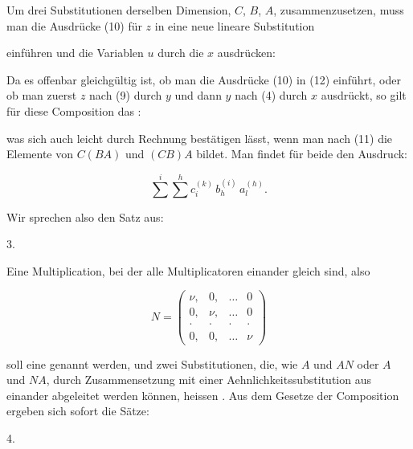 Um drei Substitutionen derselben Dimension, $C$, $B$, $A$, zusammenzusetzen, muss man die Ausdrücke (10) für $z$ in eine neue lineare Substitution


einführen und die Variablen $u$ durch die $x$ ausdrücken:


Da es offenbar gleichgültig ist, ob man die Ausdrücke (10) in (12) einführt, oder ob man zuerst $z$ nach (9) durch $y$ und dann $y$ nach (4) durch $x$ ausdrückt, so gilt für diese Composition das :


was sich auch leicht durch Rechnung bestätigen lässt, wenn man nach (11) die Elemente von $C(BA)$ und $(CB)A$ bildet. Man findet für beide den Ausdruck:

\[
\sum^i \sum^h c_i^{(k)}\, b_h^{(i)}\, a_l^{(h)}.
\]

Wir sprechen also den Satz aus:

\par
3.\enspace{}

Eine Multiplication, bei der alle Multiplicatoren einander gleich sind, also

\[
N = \begin{pmatrix} \nu, & 0, & \ldots & 0 \\ 0, & \nu, & \ldots & 0 \\ \cdot & \cdot & \cdot & \cdot \\ 0, & 0, & \ldots & \nu \end{pmatrix}
\]

soll eine  genannt werden, und zwei Substitutionen, die, wie $A$ und $AN$ oder $A$ und $NA$, durch Zusammensetzung mit einer Aehnlichkeitssubstitution aus einander abgeleitet werden können, heissen . Aus dem Gesetze der Composition ergeben sich sofort die Sätze:

\par
4.\enspace{}
